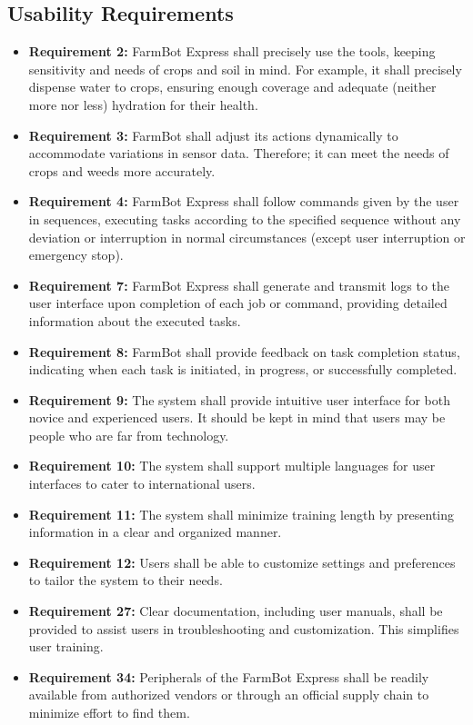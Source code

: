 \subsection{Usability Requirements}
\begin{itemize}
	\item \textbf{Requirement 2:} FarmBot Express shall precisely use the tools, keeping sensitivity and needs of crops and soil in mind. For example, it shall precisely dispense water to crops, ensuring enough coverage and adequate (neither more nor less) hydration for their health.
	\item \textbf{Requirement 3: } FarmBot shall adjust its actions dynamically to accommodate variations in sensor data. Therefore; it can meet the needs of crops and weeds more accurately.
	\item \textbf{Requirement 4:} FarmBot Express shall follow commands given by the user in sequences, executing tasks according to the specified sequence without any deviation or interruption in normal circumstances (except user interruption or emergency stop).
	\item \textbf{Requirement 7:}  FarmBot Express shall generate and transmit logs to the user interface upon completion of each job or command, providing detailed information about the executed tasks.
	\item \textbf{Requirement 8:} FarmBot shall provide feedback on task completion status, indicating when each task is initiated, in progress, or successfully completed.
	\item \textbf{Requirement 9:} The system shall provide intuitive user interface for both novice and experienced users. It should be kept in mind that users may be people who are far from technology.
	\item \textbf{Requirement 10:} The system shall support multiple languages for user interfaces to cater to international users.
	\item \textbf {Requirement 11:} The system shall minimize training length by presenting information in a clear and organized manner.
	\item \textbf {Requirement 12:} Users shall be able to customize settings and preferences to tailor the system to their needs.
	\item \textbf{Requirement 27:} Clear documentation, including user manuals, shall be provided to assist users  in troubleshooting and customization. This simplifies user training.
	\item \textbf{Requirement 34:} Peripherals of the FarmBot Express shall be readily available from authorized vendors or through an official supply chain to minimize effort to find them.

\end{itemize}
